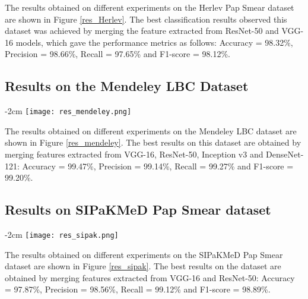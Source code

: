 \documentclass{llncs}
\begin{document}
The results obtained on different experiments on the Herlev Pap Smear dataset are shown in Figure \ref{res_Herlev}. The best classification results observed this dataset was achieved by merging the feature extracted from ResNet-50 and VGG-16 models, which gave the performance metrics as follows: Accuracy = 98.32\%, Precision = 98.66\%, Recall = 97.65\% and F1-score = 98.12\%.

\subsection{Results on the Mendeley LBC Dataset}
\begin{figure*}
\begin{adjustwidth}{-2cm}{}
    \centering
    \texttt{[image: res\_mendeley.png]}
    \caption{Results on the Mendeley LBC dataset}
    \label{res_mendeley}
\end{adjustwidth}
\end{figure*}

The results obtained on different experiments on the Mendeley LBC dataset are shown in Figure \ref{res_mendeley}. The best results on this dataset are obtained by merging features extracted from VGG-16, ResNet-50, Inception v3 and DenseNet-121: Accuracy = 99.47\%, Precision = 99.14\%, Recall = 99.27\% and F1-score = 99.20\%.

\subsection{Results on SIPaKMeD Pap Smear dataset}
\begin{figure*}
\begin{adjustwidth}{-2cm}{}
    \centering
    \texttt{[image: res\_sipak.png]}
    \caption{Results on the SIPaKMeD Pap Smear Dataset}
    \label{res_sipak}
\end{adjustwidth}
\end{figure*}

The results obtained on different experiments on the SIPaKMeD Pap Smear dataset are shown in Figure \ref{res_sipak}. The best results on the dataset are obtained by merging features extracted from VGG-16 and ResNet-50: Accuracy = 97.87\%, Precision = 98.56\%, Recall = 99.12\% and F1-score = 98.89\%.
\end{document}
